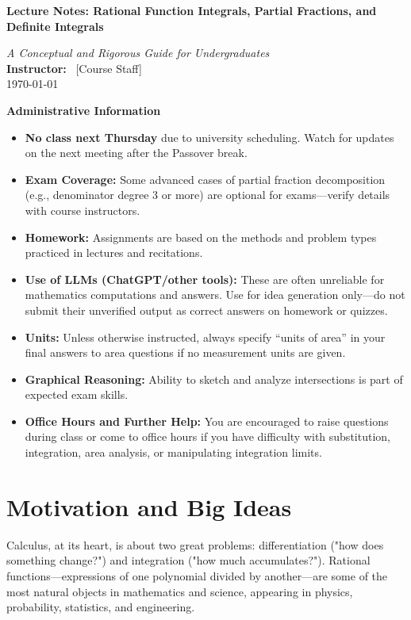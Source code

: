 \documentclass[12pt]{article}
\newenvironment{adminblock}
    {\vspace{1.5em}
     \begin{center}%
     \begin{minipage}{0.96\linewidth}%
     \setlength{\fboxsep}{10pt}%
     \begin{Sbox}\begin{minipage}{.97\linewidth}
     \textbf{Administrative Information}\\[0.6em]}
    {\end{minipage}\end{Sbox}\fbox{\TheSbox}
     \end{minipage}
     \end{center}\vspace{1.5em}}
\begin{document}
\begin{center}
    \vspace*{0.2em}
    \LARGE\textbf{Lecture Notes: Rational Function Integrals, Partial Fractions, and Definite Integrals}
    
    \vspace{0.7em}
    \large\emph{A Conceptual and Rigorous Guide for Undergraduates}\\[0.3em]
    \normalsize\textbf{Instructor:} ~[Course Staff] \\
    \today
\end{center}

\begin{adminblock}
\begin{itemize}[leftmargin=1.5em]
    \item \textbf{No class next Thursday} due to university scheduling. Watch for updates on the next meeting after the Passover break.
    \item \textbf{Exam Coverage:} Some advanced cases of partial fraction decomposition (e.g., denominator degree 3 or more) are optional for exams—verify details with course instructors.
    \item \textbf{Homework:} Assignments are based on the methods and problem types practiced in lectures and recitations.
    \item \textbf{Use of LLMs (ChatGPT/other tools):} These are often unreliable for mathematics computations and answers. Use for idea generation only—do not submit their unverified output as correct answers on homework or quizzes.
    \item \textbf{Units:} Unless otherwise instructed, always specify “units of area” in your final answers to area questions if no measurement units are given.
    \item \textbf{Graphical Reasoning:} Ability to sketch and analyze intersections is part of expected exam skills.
    \item \textbf{Office Hours and Further Help:} You are encouraged to raise questions during class or come to office hours if you have difficulty with substitution, integration, area analysis, or manipulating integration limits.
\end{itemize}
\end{adminblock}

\section{Motivation and Big Ideas}
Calculus, at its heart, is about two great problems: differentiation ("how does something change?") and integration ("how much accumulates?"). Rational functions—expressions of one polynomial divided by another—are some of the most natural objects in mathematics and science, appearing in physics, probability, statistics, and engineering.
\end{document}
